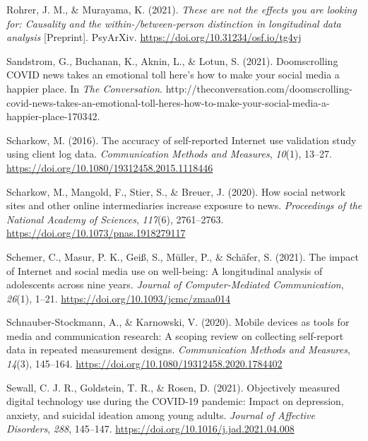 \documentclass[
  man,mask]{apa7}
\newlength{\cslhangindent}
\newlength{\cslentryspacingunit} %
\newenvironment{CSLReferences}[2] %
 {%
  \setlength{\parindent}{0pt}
  \ifodd #1
  \let\oldpar\par
  \def\par{\hangindent=\cslhangindent\oldpar}
  \fi
  \setlength{\parskip}{#2\cslentryspacingunit}
 }%
 {}
\begin{document}
\begin{CSLReferences}{1}{0}
\leavevmode{}%
Rohrer, J. M., \& Murayama, K. (2021). \emph{These are not the effects you are looking for: {Causality} and the within-/between-person distinction in longitudinal data analysis} {[}Preprint{]}. {PsyArXiv}. \url{https://doi.org/10.31234/osf.io/tg4vj}

\leavevmode{}%
Sandstrom, G., Buchanan, K., Aknin, L., \& Lotun, S. (2021). Doomscrolling {COVID} news takes an emotional toll \textendash{} here's how to make your social media a happier place. In \emph{The Conversation}. http://theconversation.com/doomscrolling-covid-news-takes-an-emotional-toll-heres-how-to-make-your-social-media-a-happier-place-170342.

\leavevmode{}%
Scharkow, M. (2016). The accuracy of self-reported {Internet} use validation study using client log data. \emph{Communication Methods and Measures}, \emph{10}(1), 13--27. \url{https://doi.org/10.1080/19312458.2015.1118446}

\leavevmode{}%
Scharkow, M., Mangold, F., Stier, S., \& Breuer, J. (2020). How social network sites and other online intermediaries increase exposure to news. \emph{Proceedings of the National Academy of Sciences}, \emph{117}(6), 2761--2763. \url{https://doi.org/10.1073/pnas.1918279117}

\leavevmode{}%
Schemer, C., Masur, P. K., Geiß, S., Müller, P., \& Schäfer, S. (2021). The impact of {Internet} and social media use on well-being: {A} longitudinal analysis of adolescents across nine years. \emph{Journal of Computer-Mediated Communication}, \emph{26}(1), 1--21. \url{https://doi.org/10.1093/jcmc/zmaa014}

\leavevmode{}%
Schnauber-Stockmann, A., \& Karnowski, V. (2020). Mobile devices as tools for media and communication research: {A} scoping review on collecting self-report data in repeated measurement designs. \emph{Communication Methods and Measures}, \emph{14}(3), 145--164. \url{https://doi.org/10.1080/19312458.2020.1784402}

\leavevmode{}%
Sewall, C. J. R., Goldstein, T. R., \& Rosen, D. (2021). Objectively measured digital technology use during the {COVID-19} pandemic: {Impact} on depression, anxiety, and suicidal ideation among young adults. \emph{Journal of Affective Disorders}, \emph{288}, 145--147. \url{https://doi.org/10.1016/j.jad.2021.04.008}


\end{CSLReferences}
\end{document}
